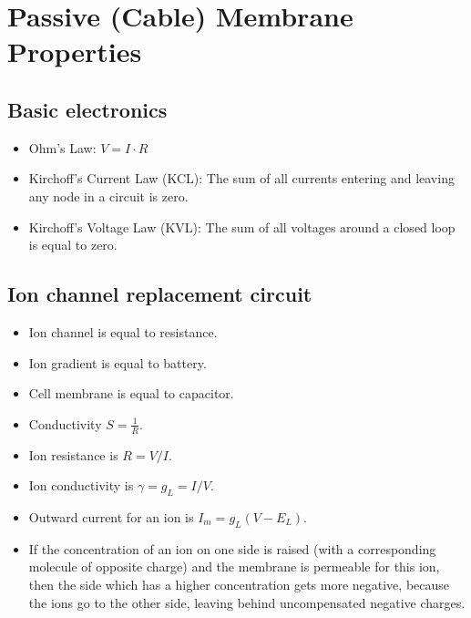 \documentclass[main]{subfiles}
\begin{document}

\section{Passive (Cable) Membrane Properties}
\subsection{Basic electronics}
\begin{itemize}[noitemsep,nolistsep]
	\item Ohm's Law: $V = I \cdot R$
	\item Kirchoff's Current Law (KCL): The sum of all currents entering and leaving any node in a circuit is zero.
	\item Kirchoff's Voltage Law (KVL): The sum of all voltages around a closed loop is equal to zero.
\end{itemize}

\subsection{Ion channel replacement circuit}
\begin{itemize}[noitemsep,nolistsep]
	\item Ion channel is equal to resistance.
	\item Ion gradient is equal to battery.
	\item Cell membrane is equal to capacitor.
	\item Conductivity $S=\frac{1}{R}$.
	\item Ion resistance is $R = V/I$.
	\item Ion conductivity is $\gamma = g_L = I/V$.
	\item Outward current for an ion is $I_m=g_L(V-E_L)$.
	\item If the concentration of an ion on one side is raised (with a corresponding molecule of opposite charge) and the membrane is permeable for this ion, then the side which has a higher concentration gets more negative, because the ions go to the other side, leaving behind uncompensated negative charges.
\end{itemize}
\begin{figure}[H]
	\centering
\end{figure}
\begin{figure}[H]
	\centering
\end{figure}
\end{document}
